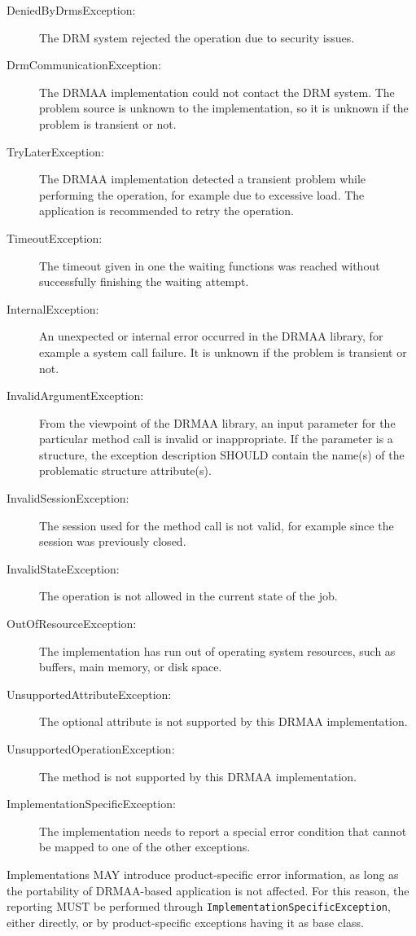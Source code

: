 \documentclass{article}
\newcommand{\h}[1]{\lstinline|#1|}
\begin{document}
\begin{description}
\item[DeniedByDrmsException:] The DRM system rejected the operation due to security issues.
\item[DrmCommunicationException:] The DRMAA implementation could not contact the DRM system. The problem source is unknown to the implementation, so it is unknown if the problem is transient or not.
\item[TryLaterException:] The DRMAA implementation detected a transient problem while performing the operation, for example due to excessive load. The application is recommended to retry the operation.
\item[TimeoutException:] The timeout given in one the waiting functions was reached without successfully finishing the waiting attempt.
\item[InternalException:] An unexpected or internal error occurred in the DRMAA library, for example a system call failure. It is unknown if the problem is transient or not.
\item[InvalidArgumentException:] From the viewpoint of the DRMAA library, an input parameter for the particular method call is invalid or inappropriate. If the parameter is a structure, the exception description SHOULD contain the name(s) of the problematic structure attribute(s).
\item[InvalidSessionException:] The session used for the method call is not valid, for example since the session was previously closed.
\item[InvalidStateException:] The operation is not allowed in the current state of the job.
\item[OutOfResourceException:] The implementation has run out of operating system resources, such as buffers, main memory, or disk space.
\item[UnsupportedAttributeException:] The optional attribute is not supported by this DRMAA implementation.
\item[UnsupportedOperationException:] The method is not supported by this DRMAA implementation.
\item[ImplementationSpecificException:] The implementation needs to report a special error condition that cannot be mapped to one of the other exceptions.
\end{description}

Implementations MAY introduce product-specific error information, as long as the portability of DRMAA-based application is not affected. For this reason, the reporting MUST be performed through  \h{ImplementationSpecificException}, either directly, or by product-specific exceptions having it as base class.
\end{document}
